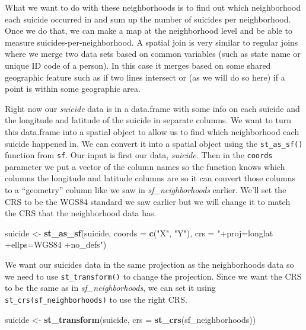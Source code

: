\documentclass[
  12pt,
]{book}
\newenvironment{Shaded}{\begin{snugshade}}{\end{snugshade}}
\newcommand{\DataTypeTok}[1]{\textcolor[rgb]{0.27,0.27,0.27}{#1}}
\newcommand{\KeywordTok}[1]{\textcolor[rgb]{0.27,0.27,0.27}{\textbf{#1}}}
\newcommand{\NormalTok}[1]{#1}
\newcommand{\StringTok}[1]{\textcolor[rgb]{0.5,0.5,0.5}{#1}}
\begin{document}
What we want to do with these neighborhoods is to find out which neighborhood each suicide occurred in and sum up the number of suicides per neighborhood. Once we do that, we can make a map at the neighborhood level and be able to measure suicides-per-neighborhood. A spatial join is very similar to regular joins where we merge two data sets based on common variables (such as state name or unique ID code of a person). In this case it merges based on some shared geographic feature such as if two lines intersect or (as we will do so here) if a point is within some geographic area.

Right now our \emph{suicide} data is in a data.frame with some info on each suicide and the longitude and latitude of the suicide in separate columns. We want to turn this data.frame into a spatial object to allow us to find which neighborhood each suicide happened in. We can convert it into a spatial object using the \texttt{st\_as\_sf()} function from \texttt{sf}. Our input is first our data, \emph{suicide.} Then in the \texttt{coords} parameter we put a vector of the column names so the function knows which columns the longitude and latitude columns are so it can convert those columns to a ``geometry'' column like we saw in \emph{sf\_neighborhoods} earlier. We'll set the CRS to be the WGS84 standard we saw earlier but we will change it to match the CRS that the neighborhood data has.

\begin{Shaded}
\begin{Highlighting}[]
\NormalTok{suicide <{-}}\StringTok{ }\KeywordTok{st\_as\_sf}\NormalTok{(suicide, }
                    \DataTypeTok{coords =} \KeywordTok{c}\NormalTok{(}\StringTok{"X"}\NormalTok{, }\StringTok{"Y"}\NormalTok{),}
                    \DataTypeTok{crs =} \StringTok{"+proj=longlat +ellps=WGS84 +no\_defs"}\NormalTok{)}
\end{Highlighting}
\end{Shaded}

We want our suicides data in the same projection as the neighborhoods data so we need to use \texttt{st\_transform()} to change the projection. Since we want the CRS to be the same as in \emph{sf\_neighborhoods}, we can set it using \texttt{st\_crs(sf\_neighborhoods)} to use the right CRS.

\begin{Shaded}
\begin{Highlighting}[]
\NormalTok{suicide <{-}}\StringTok{ }\KeywordTok{st\_transform}\NormalTok{(suicide, }
                        \DataTypeTok{crs =} \KeywordTok{st\_crs}\NormalTok{(sf\_neighborhoods))}
\end{Highlighting}
\end{Shaded}
\end{document}
